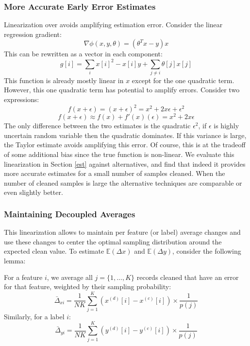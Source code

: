 \subsubsection{More Accurate Early Error Estimates}\label{acc}
Linearization over avoids amplifying estimation error.
Consider the linear regression gradient:
\[
\nabla\phi(x,y,\theta) = (\theta^Tx - y)x
\]
This can be rewritten as a vector in each component:
\[
g[i] = \sum_{i} x[i]^2-x[i]y + \sum_{j \ne i} \theta[j]x[j]
\]
This function is already mostly linear in $x$ except for the one quadratic term.
However, this one quadratic term has potential to amplify errors.
Consider two expressions:
\[
f(x+\epsilon) = (x+\epsilon)^2 = x^2 + 2x\epsilon + \epsilon^2
\]
\[
f(x+\epsilon) \approx f(x) + f'(x)(\epsilon) = x^2 + 2x\epsilon
\]
The only difference between the two estimates is the quadratic $\epsilon^2$, if $\epsilon$ is highly uncertain random variable then the quadratic dominates.
If this variance is large, the Taylor estimate avoids amplifying this error.
Of course, this is at the tradeoff of some additional bias since the true function is non-linear.
We evaluate this linearization in Section \ref{est} against alternatives, and find that indeed it provides more accurate estimates for a small number of samples cleaned.
When the number of cleaned samples is large the alternative techniques are comparable or even slightly better.


\subsubsection{Maintaining Decoupled Averages}
This linearization allows \sys to maintain per feature (or label) average changes and use these changes to center the optimal sampling distribution around the expected clean value.
To estimate $\mathbb{E}(\Delta x)$ and $\mathbb{E}(\Delta y)$, consider the following lemma:
\begin{lemma}
For a feature $i$, we average all $j=\{1,...,K\}$ records cleaned that have an error for that feature, weighted by their sampling probability:
\[
\bar{\Delta}_{xi} = \frac{1}{NK}\sum_{j=1}^K (x^{(d)}[i]-x^{(c)}[i])\times \frac{1}{p(j)}
\]
Similarly, for a label $i$:
\[
\bar{\Delta}_{yi} = \frac{1}{NK}\sum_{j=1}^K (y^{(d)}[i]-y^{(c)}[i])\times \frac{1}{p(j)}
\]
\end{lemma}

